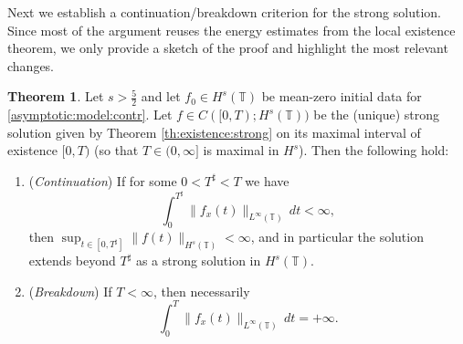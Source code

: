 \documentclass[reqno]{amsart}
\newcommand{\TT}{\mathbb T}
\theoremstyle{definition}
\newtheorem{theorem}{Theorem}
\numberwithin{equation}{section}
\numberwithin{theorem}{section}
\numberwithin{definition}{section}
\begin{document}
\noindent

Next we establish a continuation/breakdown criterion for the strong solution.  Since most of the argument reuses the energy estimates from the local existence theorem, we only provide a sketch of the proof and highlight the most relevant changes.

\begin{theorem}\label{th:continuation}
	Let $s>\frac{5}{2}$ and let $f_0\in H^s(\TT)$ be mean-zero initial data for \eqref{asymptotic:model:contr}.
	Let $f\in C([0,T);H^s(\TT))$ be the (unique) strong solution given by Theorem \ref{th:existence:strong} on its
	maximal interval of existence $[0,T)$ (so that $T\in(0,\infty]$ is maximal in $H^s$).
	Then the following hold:
	\begin{enumerate}
		\item[(i)] (\emph{Continuation}) If for some $0<T^\sharp<T$ we have
		\begin{equation}\label{crit:intLip}
			\int_0^{T^\sharp}\|f_x(t)\|_{L^\infty(\TT)}\,dt<\infty,
		\end{equation}
		then $\sup_{t\in[0,T^\sharp]}\|f(t)\|_{H^s(\TT)}<\infty$, and in particular the solution extends
		beyond $T^\sharp$ as a strong solution in $H^s(\TT)$.
		
		\item[(ii)] (\emph{Breakdown}) If $T<\infty$, then necessarily
		\begin{equation}\label{crit:breakdown}
			\int_0^{T}\|f_x(t)\|_{L^\infty(\TT)}\,dt=+\infty.
		\end{equation}
	\end{enumerate}
\end{theorem}
\end{document}
